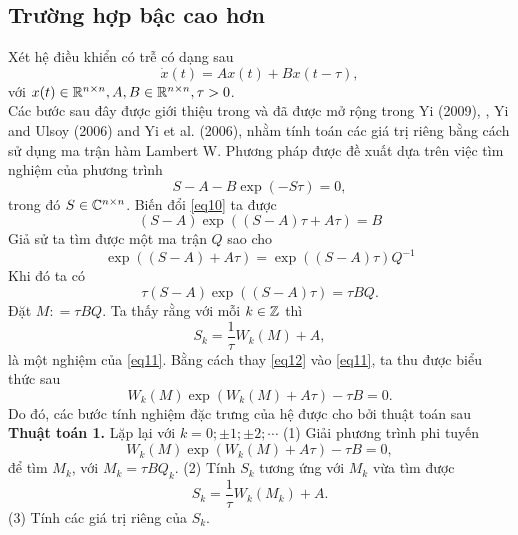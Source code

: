 \subsection{Trường hợp bậc cao hơn}
Xét hệ điều khiển có trễ có dạng sau
\begin{equation}\label{eq9}
	\dot{x}(t)=Ax(t) + Bx(t -\tau),
\end{equation}
với $x(t)\in \mathbb{R}^{n\times n}, A, B \in \mathbb{R}^{n\times n}, \tau > 0$.\\
Các bước sau đây được giới thiệu trong \cite{AslU03} và đã được mở rộng trong Yi (2009),  \cite{Yi10}, Yi and Ulsoy (2006) and Yi et al. (2006), nhằm tính toán các giá trị riêng bằng cách sử dụng ma trận hàm Lambert W. Phương pháp được đề xuất dựa trên việc tìm nghiệm của phương trình
\begin{equation}\label{eq10}
	S-A-B \exp (-S\tau)=0,
\end{equation}
trong đó $S \in \mathbb{C}^{n\times n}$. Biến đổi \eqref{eq10} ta được
\begin{equation*}
	(S - A) \exp \left( (S - A) \tau + A \tau \right) = B
\end{equation*}
Giả sử ta tìm được một ma trận $Q$ sao cho
\begin{equation*}
	\exp \left((S-A) + A\tau \right) = \exp \left( (S-A) \tau \right)Q^{-1}	
\end{equation*}
Khi đó ta có
\begin{equation}\label{eq11}
	\tau (S -A)\exp((S-A)\tau)= \tau BQ.
\end{equation}
Đặt $M : = \tau BQ$. Ta thấy rằng với mỗi $k \in \mathbb{Z}$ thì
\begin{equation}\label{eq12}
	S_k = \dfrac{1}{\tau}W_k(M) + A,
\end{equation}
là một nghiệm của \eqref{eq11}. Bằng cách thay \eqref{eq12} vào \eqref{eq11}, ta thu được biểu thức sau
\begin{equation}\label{eq13}
	W_k(M)\exp (W_k(M)+A\tau)-\tau B=0.
\end{equation}
Do đó, các bước tính nghiệm đặc trưng của hệ được cho bởi thuật toán sau\\

\noindent\textbf{Thuật toán 1.} Lặp lại với $k = 0;\pm 1; \pm2; \cdots$
(1) Giải phương trình phi tuyến
\begin{equation}\label{eq14}
	W_k(M)\exp (W_k(M)+A\tau)-\tau B=0,
\end{equation}
để tìm $M_k$, với $M_k = \tau B Q_k$.
(2) Tính $S_k$ tương ứng với $M_k$ vừa tìm được
\begin{equation}\label{eq15}
	S_k= \dfrac{1}{\tau}W_k(M_k)+A.
\end{equation}
(3) Tính các giá trị riêng của $S_k$.\\

